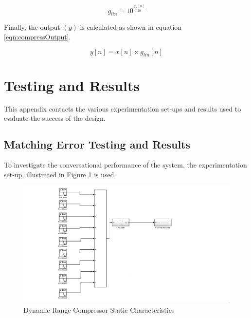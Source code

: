 \documentclass[11pt,onecolumn]{witseiepaper}
\begin{document}
\begin{appendices}
\begin{equation}
\label{eqn:glin}
g_{lin} = 10^{\frac{g_m[n]}{20}}
\end{equation}

\noindent Finally, the output $(y)$ is calculated as shown in equation \ref{eqn:compressOutput}.

\begin{equation}
\label{eqn:compressOutput}
y[n] = x[n] \times g_{lin}[n]
\end{equation}


\section{Testing and Results}
\label{app:test}

\noindent This appendix contacts the various experimentation set-ups and results used to evaluate the success of the design.

\subsection{Matching Error Testing and Results}
\label{app:testMatErr}

\noindent To investigate the conversational performance of the system, the experimentation set-up, illustrated in Figure \ref{fig:matErrTest} is used.

\begin{figure}[h]
\centering
\includegraphics[width=0.6\linewidth]{matErrTest.PNG}
\caption{Dynamic Range Compressor Static Characteristics}
\label{fig:matErrTest}
\end{figure}

\FloatBarrier



\end{appendices}
\end{document}
